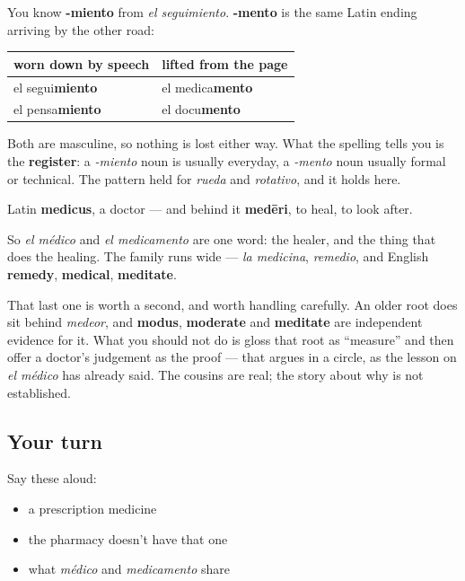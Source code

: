 \begin{grammarlens}[title={Grammar Lens: -mento and -miento are the same ending}]
You know \textbf{-miento} from \emph{el seguimiento}. \textbf{-mento} is the same Latin ending arriving by the other road:

\noindent
\begin{tabularx}{\linewidth}{@{}>{\raggedright\arraybackslash}X>{\raggedright\arraybackslash}X@{}}
\toprule
\textbf{worn down by speech} & \textbf{lifted from the page} \\
\midrule
el segui\textbf{miento} & el medica\textbf{mento} \\
el pensa\textbf{miento} & el docu\textbf{mento} \\
\bottomrule
\end{tabularx}

Both are masculine, so nothing is lost either way. What the spelling tells you is the \textbf{register}: a \emph{-miento} noun is usually everyday, a \emph{-mento} noun usually formal or technical. The pattern held for \emph{rueda} and \emph{rotativo}, and it holds here.
\end{grammarlens}

\begin{cousinweb}
Latin \textbf{medicus}, a doctor — and behind it \textbf{medēri}, to heal, to look after.

So \emph{el médico} and \emph{el medicamento} are one word: the healer, and the thing that does the healing. The family runs wide — \emph{la medicina}, \emph{remedio}, and English \textbf{remedy}, \textbf{medical}, \textbf{meditate}.

That last one is worth a second, and worth handling carefully. An older root does sit behind \emph{medeor}, and \textbf{modus}, \textbf{moderate} and \textbf{meditate} are independent evidence for it. What you should not do is gloss that root as \textquotedblleft{}measure\textquotedblright{} and then offer a doctor's judgement as the proof — that argues in a circle, as the lesson on \emph{el médico} has already said. The cousins are real; the story about why is not established.
\end{cousinweb}

\subsection*{Your turn}
Say these aloud:

\begin{itemize}
\raggedright
  \item a prescription medicine
  \item the pharmacy doesn't have that one
  \item what \emph{médico} and \emph{medicamento} share
\end{itemize}

